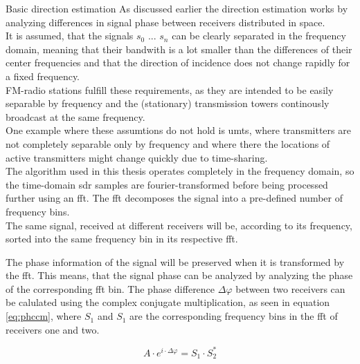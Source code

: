 \begin{subchapter}{Basic direction estimation}
  As discussed earlier the direction estimation works by
  analyzing differences in signal phase between receivers
  distributed in space. \\

  It is assumed, that the signals $s_0$ ... $s_n$
  can be clearly separated in the frequency domain,
  meaning that their bandwith is a lot smaller than
  the differences of their center frequencies
  and that the direction of incidence does not
  change rapidly for a fixed frequency. \\

  FM-radio stations fulfill these requirements,
  as they are intended to be easily separable by
  frequency and the (stationary) transmission towers continously
  broadcast at the same frequency. \\

  One example where these assumtions do not hold is
  \acrshort{umts}, where transmitters are not completely
  separable only by frequency and where there the locations
  of active transmitters might change quickly due
  to time-sharing. \\

  The algorithm used in this thesis operates completely
  in the frequency domain, so the time-domain \gls{sdr}
  samples are fourier-transformed before being processed
  further using an \gls{fft}.
  The \gls{fft} decomposes the signal into a pre-defined
  number of frequency bins. \\

  The same signal, received at different receivers will
  be, according to its frequency, sorted into the same
  frequency bin in its respective \gls{fft}.

  The phase information of the signal will be preserved
  when it is transformed by the \gls{fft}.
  This means, that the signal phase can be analyzed by
  analyzing the phase of the corresponding \gls{fft}
  bin.
  The phase difference $\Delta \varphi$ between two
  receivers can be calulated using the complex conjugate
  multiplication, as seen in equation \ref{eq:phccm},
  where $S_\text{1}$ and $S_\text{1}$ are the corresponding
  frequency bins in the \gls{fft} of receivers one and two.

  \begin{equation}
    \label{eq:phccm}
    A \cdot e^{i \cdot \Delta \varphi}
    = S_\text{1} \cdot S_\text{2}^\ast
  \end{equation}


\end{subchapter}
